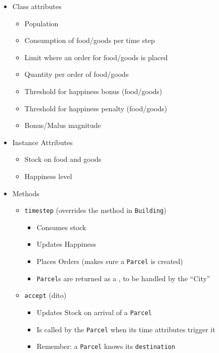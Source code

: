 \begin{frame}[fragile]
%
\begin{tcbraster}[raster columns=2,
                  raster equal height,
                  nobeforeafter,
                  raster column skip=0.5cm]
\begin{tcolorbox}[title=Class \texttt{Residential}]
\begin{itemize}
\item Class attributes
	\begin{itemize}
	\item Population
	\item Consumption of food/goods per time step
	\item Limit where an order for food/goods is placed
	\item Quantity per order of food/goods
	\item Threshold for happiness bonus (food/goods)
	\item Threshold for happiness penalty (food/goods)
	\item Bonus/Malus magnitude
	\end{itemize}
\item Instance Attributes
	\begin{itemize}
	\item Stock on food and goods
	\item Happiness level
	\end{itemize}
\end{itemize}
\end{tcolorbox}
%
\begin{tcolorbox}[title=Class \texttt{Residential} (Continued)]
\begin{itemize}
\item Methods
	\begin{itemize}
	\item \texttt{timestep} (overrides the method in \texttt{Building})
		\begin{itemize}
		\item Consumes stock
		\item Updates Happiness
		\item Places Orders (\ie makes sure a \texttt{Parcel} is created)
		\item \texttt{Parcel}s are returned as a , to be handled by the \enquote{City}
		\end{itemize}
	\item \texttt{accept} (dito)
		\begin{itemize}
		\item Updates Stock on arrival of a \texttt{Parcel}
		\item Is called by the \texttt{Parcel} when its time attributes trigger it
		\item Remember: a \texttt{Parcel} knows its \texttt{destination}
		\end{itemize}
	\end{itemize}
\end{itemize}

\end{tcolorbox}
\end{tcbraster}
%
\end{frame}

